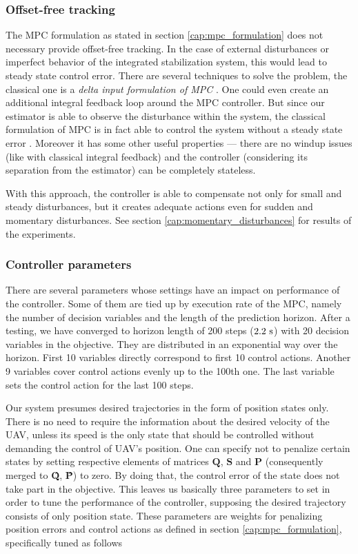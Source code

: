 \subsubsection{Offset-free tracking}
\label{cap:offset_free_tracking}

The MPC formulation as stated in section \ref{cap:mpc_formulation} does not necessary provide offset-free tracking. In the case of external disturbances or imperfect behavior of the integrated stabilization system, this would lead to steady state control error. There are several techniques to solve the problem, the classical one is a \emph{delta input formulation of MPC} \citep{borrelli2007offsetfree}. One could even create an additional integral feedback loop around the MPC controller. But since our estimator is able to observe the disturbance within the system, the classical formulation of MPC is in fact able to control the system without a steady state error \citep{rossiter2013mpcpracticalapproach}. Moreover it has some other useful properties --- there are no windup issues (like with classical integral feedback) and the controller (considering its separation from the estimator) can be completely stateless. 

With this approach, the controller is able to compensate not only for small and steady disturbances, but it creates adequate actions even for sudden and momentary disturbances. See section \ref{cap:momentary_disturbances} for results of the experiments.

\subsubsection{Controller parameters}
\label{cap:implementation_performance}

There are several parameters whose settings have an impact on performance of the controller. Some of them are tied up by execution rate of the MPC, namely the number of decision variables and the length of the prediction horizon.  After a testing, we have converged to horizon length of 200 steps ($2.2~\mathrm{s}$) with 20 decision variables in the objective. They are distributed in an exponential way over the horizon. First 10 variables directly correspond to first 10 control actions. Another 9 variables cover control actions evenly up to the 100th one. The last variable sets the control action for the last 100 steps.

Our system presumes desired trajectories in the form of position states only. There is no need to require the information about the desired velocity of the UAV, unless its speed is the only state that should be controlled without demanding the control of UAV's position. One can specify not to penalize certain states by setting respective elements of matrices $\textbf{Q}$, $\textbf{S}$ and $\textbf{P}$ (consequently merged to \textbf{\^Q}, \textbf{\^P}) to zero. By doing that, the control error of the state does not take part in the objective. This leaves us basically three parameters to set in order to tune the performance of the controller, supposing the desired trajectory consists of only position state. These parameters are weights for penalizing position errors and control actions as defined in section \ref{cap:mpc_formulation}, specifically tuned as follows

